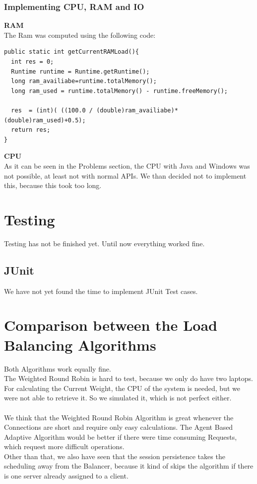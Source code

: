 \documentclass[12pt]{article}
\begin{document}
\subsubsection{Implementing CPU, RAM and IO} 
\textbf{RAM}\\
The Ram was computed using the following code:
\begin{lstlisting}
public static int getCurrentRAMLoad(){
  int res = 0;
  Runtime runtime = Runtime.getRuntime();
  long ram_availiabe=runtime.totalMemory();
  long ram_used = runtime.totalMemory() - runtime.freeMemory();
		
  res  = (int)( ((100.0 / (double)ram_availiabe)*(double)ram_used)+0.5);
  return res;
}	
\end{lstlisting}
\textbf{CPU}\\
As it can be seen in the Problems section, the CPU with Java and Windows was not possible, at least not with normal APIs. We than decided not to implement this, because this took too long.
\section{Testing}
Testing has not be finished yet. Until now everything worked fine.
\subsection{JUnit}
We have not yet found the time to implement JUnit Test cases.
\section{Comparison between the Load Balancing Algorithms}
Both Algorithms work equally fine. \\
The Weighted Round Robin is hard to test, because we only do have two laptops.
For calculating the Current Weight, the CPU of the system is needed, but we were not able to retrieve it.
So we simulated it, which is not perfect either.
\\ \\
We think that the Weighted Round Robin Algorithm is great whenever the Connections are short and require only easy calculations. The Agent Based Adaptive Algorithm would be better if there were time consuming Requests, which request more difficult operations. \\
Other than that, we also have seen that the session persistence takes the scheduling away from the Balancer, because it kind of skips the algorithm if there is one server already assigned to a client.
\end{document}
